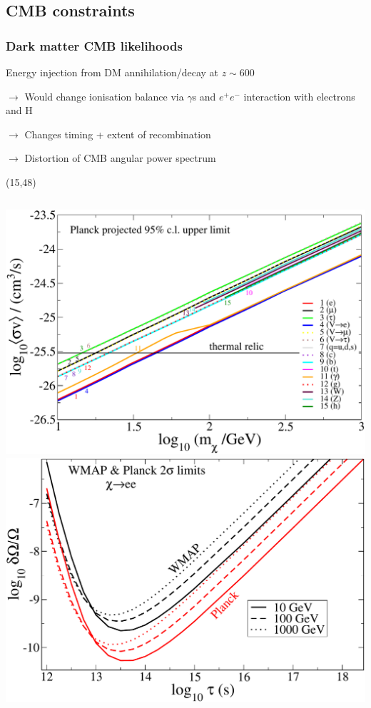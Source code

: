 \documentclass[xcolor=dvipsnames]{beamer}
\begin{document}
\subsection{CMB constraints}

\begin{frame}
\frametitle{Dark matter CMB likelihoods}

Energy injection from DM annihilation/decay at $z\sim600$
\bi
\item[$\rightarrow$] Would change ionisation balance via $\gamma$s and $e^+e^-$ interaction with electrons and H
\item[$\rightarrow$] Changes timing + extent of recombination
\item[$\rightarrow$] Distortion of CMB angular power spectrum
\ei
\vspace{4cm}

\begin{textblock}{70}(15,48)
    \begin{columns}
    \includegraphics[width=1.1\textwidth]{planck-limit}
    \includegraphics[width=1.1\textwidth]{electrons-w-Planck}
    \end{columns}\vspace{3mm}
\end{textblock}


\end{frame}
\end{document}
